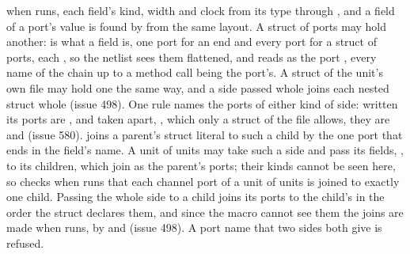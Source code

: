  when  runs, each field's kind,
width and clock from its type through , and a field of
a port's value is found by  from the same
layout. A struct of ports may hold another:  is what
a field is, one port for an end and every port for a struct of ports,
each , so the netlist sees them flattened, and
 reads  as the port
, every name of the chain up to a method call
being the port's. A struct of the unit's own file may hold one the
same way, and a side passed whole joins each nested struct whole
(issue 498). One rule names the ports of either kind of side: written
 its ports are , and taken apart,
, which only a struct of the file allows, they
are  and  (issue 580).  joins a parent's struct literal to such a
child by the one port that ends in the field's name. A unit of units
may take such a side and pass its fields, , to its
children, which join as the parent's ports; their kinds cannot be
seen here, so  checks when 
runs that each channel port of a unit of units is joined to exactly
one child. Passing the whole side to a child joins its ports to the
child's in the order the struct declares them, and since the macro
cannot see them the joins are made when  runs, by
 and  (issue 498). A port name
that two sides both give is refused.

